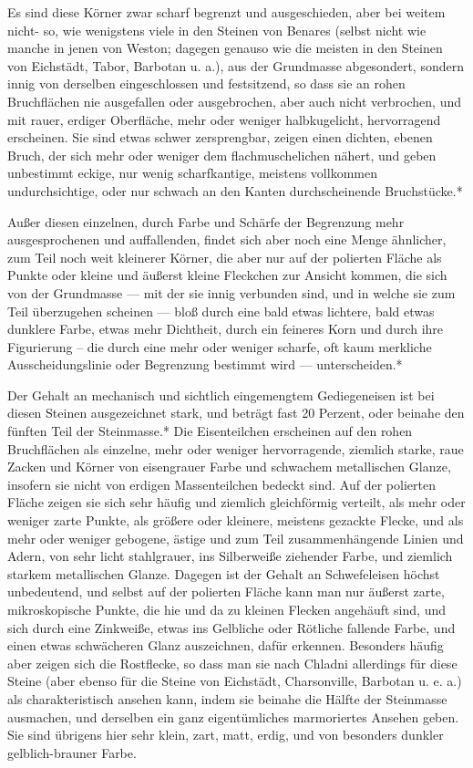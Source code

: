 \documentclass[a4paper, 11pt, oneside, german]{article}
\begin{document}
Es sind diese Körner zwar scharf begrenzt und ausgeschieden, aber bei weitem nicht- so, wie wenigstens viele in den Steinen von Benares (selbst nicht wie manche in jenen von Weston; dagegen genauso wie die meisten in den Steinen von Eichstädt, Tabor, Barbotan u. a.), aus der Grundmasse abgesondert, sondern innig von derselben eingeschlossen und festsitzend, so dass sie an rohen Bruchflächen nie ausgefallen oder ausgebrochen, aber auch nicht verbrochen, und mit rauer, erdiger Oberfläche, mehr oder weniger halbkugelicht, hervorragend erscheinen. Sie sind etwas schwer zersprengbar, zeigen einen dichten, ebenen Bruch, der sich mehr oder weniger dem flachmuschelichen nähert, und geben unbestimmt eckige, nur wenig scharfkantige, meistens vollkommen undurchsichtige, oder nur schwach an den Kanten durchscheinende Bruchstücke.*

Außer diesen einzelnen, durch Farbe und Schärfe der Begrenzung mehr ausgesprochenen und auffallenden, findet sich aber noch eine Menge ähnlicher, zum Teil noch weit kleinerer Körner, die aber nur auf der polierten Fläche als Punkte oder kleine und äußerst kleine Fleckchen zur Ansicht kommen, die sich von der Grundmasse --- mit der sie innig verbunden sind, und in welche sie zum Teil überzugehen scheinen --- bloß durch eine bald etwas lichtere, bald etwas dunklere Farbe, etwas mehr Dichtheit, durch ein feineres Korn und durch ihre Figurierung -- die durch eine mehr oder weniger scharfe, oft kaum merkliche Ausscheidungslinie oder Begrenzung bestimmt wird --- unterscheiden.*

Der Gehalt an mechanisch und sichtlich eingemengtem Gediegeneisen ist bei diesen Steinen ausgezeichnet stark, und beträgt fast 20 Perzent, oder beinahe den fünften Teil der Steinmasse.* Die Eisenteilchen erscheinen auf den rohen Bruchflächen als einzelne, mehr oder weniger hervorragende, ziemlich starke, raue Zacken und Körner von eisengrauer Farbe und schwachem metallischen Glanze, insofern sie nicht von erdigen Massenteilchen bedeckt sind. Auf der polierten Fläche zeigen sie sich sehr häufig und ziemlich gleichförmig verteilt, als mehr oder weniger zarte Punkte, als größere oder kleinere, meistens gezackte Flecke, und als mehr oder weniger gebogene, ästige und zum Teil zusammenhängende Linien und Adern, von sehr licht stahlgrauer, ins Silberweiße ziehender Farbe, und ziemlich starkem metallischen Glanze. Dagegen ist der Gehalt an Schwefeleisen höchst unbedeutend, und selbst auf der polierten Fläche kann man nur äußerst zarte, mikroskopische Punkte, die hie und da zu kleinen Flecken angehäuft sind, und sich durch eine Zinkweiße, etwas ins Gelbliche oder Rötliche fallende Farbe, und einen etwas schwächeren Glanz auszeichnen, dafür erkennen. Besonders häufig aber zeigen sich die Rostflecke, so dass man sie nach Chladni allerdings für diese Steine (aber ebenso für die Steine von Eichstädt, Charsonville, Barbotan u. e. a.) als charakteristisch ansehen kann, indem sie beinahe die Hälfte der Steinmasse ausmachen, und derselben ein ganz eigentümliches marmoriertes Ansehen geben. Sie sind übrigens hier sehr klein, zart, matt, erdig, und von besonders dunkler gelblich-brauner Farbe.
\end{document}
